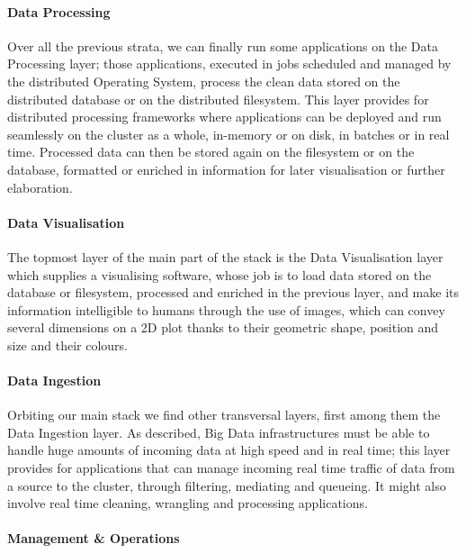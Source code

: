 \paragraph{Data Processing}

Over all the previous strata, we can finally run some applications on the Data Processing layer; those applications, executed in jobs scheduled and managed by the distributed Operating System, process the clean data stored on the distributed database or on the distributed filesystem.\newline
This layer provides for distributed processing frameworks where applications can be deployed and run seamlessly on the cluster as a whole, in-memory or on disk, in batches or in real time.\newline
Processed data can then be stored again on the filesystem or on the database, formatted or enriched in information for later visualisation or further elaboration.

\paragraph{Data Visualisation}

The topmost layer of the main part of the stack is the Data Visualisation layer which supplies a visualising software, whose job is to load data stored on the database or filesystem, processed and enriched in the previous layer, and make its information intelligible to humans through the use of images, which can convey several dimensions on a 2D plot thanks to their geometric shape, position and size and their colours.

\paragraph{Data Ingestion}

Orbiting our main stack we find other transversal layers, first among them the Data Ingestion layer.\newline
As described, Big Data infrastructures must be able to handle huge amounts of incoming data at high speed and in real time; this layer provides for applications that can manage incoming real time traffic of data from a source to the cluster, through filtering, mediating and queueing. It might also involve real time cleaning, wrangling and processing applications.

\paragraph{Management \& Operations}


